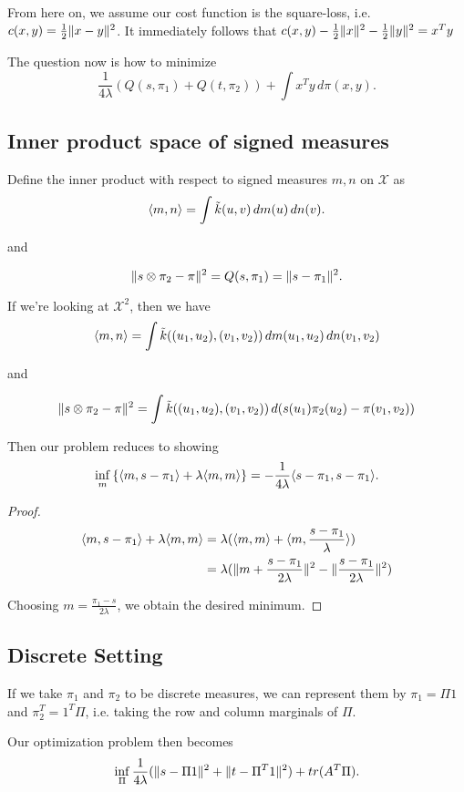 From here on, we assume our cost function is the square-loss, i.e. $c(x,y)=\frac{1}{2}\lVert x-y\rVert^2$. It immediately follows that $c(x,y)-\frac{1}{2}\lVert x\rVert^2 - \frac{1}{2}\lVert y\rVert^2 = x^{T}y$

The question now is how to minimize 
$$
\frac{1}{4\lambda} (Q(s,\pi_1)+Q(t,\pi_2)) + \int x^{T}y\,d\pi(x,y).
$$

\subsection{Inner product space of signed measures}
Define the inner product with respect to signed measures $m,n$ on $\mathcal{X}$ as $$\langle m,n\rangle = \int \tilde{k}(u,v)\,dm(u)\,dn(v).$$

and

$$\lVert s\otimes \pi_2 - \pi\rVert^2 = Q(s,\pi_1) = \lVert s-\pi_1\rVert^2.$$

If we're looking at $\mathcal{X}^2$, then we have
$$
\langle m,n\rangle = \int \tilde{k}((u_1,u_2),(v_1,v_2))\,dm(u_1,u_2)\,dn(v_1,v_2)
$$

and

$$\lVert s\otimes \pi_2 - \pi\rVert^2 = \int \tilde{k}((u_1,u_2),(v_1,v_2))\,d(s(u_1)\pi_2(u_2)-\pi(v_1,v_2))$$

Then our problem reduces to showing $$\inf_m \left\lbrace \langle m,s-\pi_1\rangle + \lambda \langle m,m\rangle\right\rbrace  = -\frac{1}{4\lambda} \langle s-\pi_1,s-\pi_1\rangle.$$

\begin{proof}
	\begin{align*}
	\langle m,s-\pi_1\rangle + \lambda\langle m,m\rangle &= \lambda(\langle m,m\rangle+\langle m,\frac{s-\pi_1}{\lambda}\rangle) \\
	&= \lambda (\lVert m + \frac{s-\pi_1}{2\lambda}\rVert^2 - \lVert\frac{s-\pi_1}{2\lambda}\rVert^2)
	\end{align*}
	
	Choosing $m = \frac{\pi_1 - s}{2\lambda}$, we obtain the desired minimum.
\end{proof}

\subsection{Discrete Setting}

If we take $\pi_1$ and $\pi_2$ to be discrete measures, we can represent them by $\pi_1 = \Pi 1$ and $\pi_2^T=1^{T}\Pi$, i.e. taking the row and column marginals of $\Pi$.

Our optimization problem then becomes $$\inf_{\Pi} \frac{1}{4\lambda} (\lVert s-\Pi 1\rVert^2+\lVert t-\Pi^{T} 1\rVert^2) + tr(A^{T}\Pi).$$

